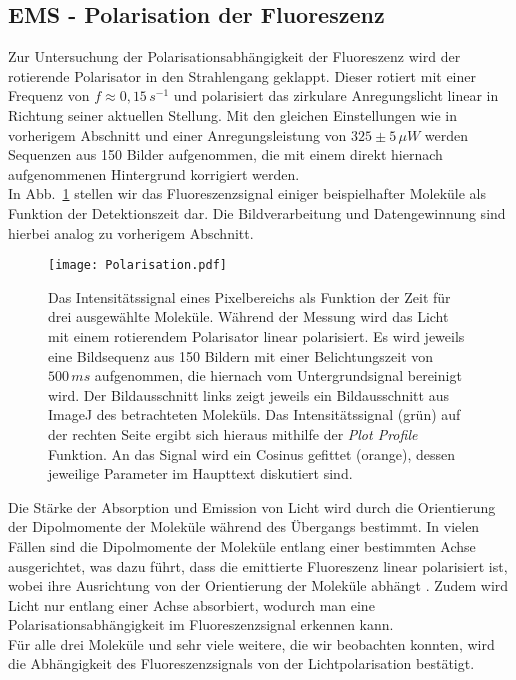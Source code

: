 \subsection{\label{subsec:A3}EMS - Polarisation der Fluoreszenz}
Zur Untersuchung der Polarisationsabhängigkeit der Fluoreszenz wird der rotierende Polarisator in den 
Strahlengang geklappt. Dieser rotiert mit einer Frequenz von $f\approx 0,15\,\si{s^{-1}}$ und 
polarisiert das zirkulare Anregungslicht linear in Richtung seiner aktuellen Stellung. 
Mit den gleichen Einstellungen wie in vorherigem Abschnitt und einer Anregungsleistung von $325\pm5\,\si{\mu W}$ werden 
Sequenzen aus 150 Bilder aufgenommen, 
die mit einem direkt hiernach aufgenommenen Hintergrund korrigiert werden. \\
In Abb.~\ref{fig:polari} stellen wir das Fluoreszenzsignal einiger beispielhafter Moleküle als Funktion der 
Detektionszeit dar. Die Bildverarbeitung und Datengewinnung sind hierbei analog zu vorherigem Abschnitt.
\begin{figure}[h!]
    \centering
    \texttt{[image: Polarisation.pdf]}
    \caption{\label{fig:polari}Das Intensitätssignal eines Pixelbereichs als Funktion
    der Zeit für drei ausgewählte Moleküle. 
    Während der Messung wird das Licht mit einem rotierendem
    Polarisator linear polarisiert. Es wird jeweils eine Bildsequenz aus 150 Bildern mit einer Belichtungszeit von 
    $500\,\si{ms}$ aufgenommen, die hiernach vom Untergrundsignal bereinigt wird. Der Bildausschnitt links zeigt jeweils 
    ein Bildausschnitt aus ImageJ des betrachteten Moleküls. Das Intensitätssignal (grün) auf der rechten Seite ergibt sich 
    hieraus mithilfe der \textit{Plot Profile} Funktion. An das Signal wird ein Cosinus gefittet (orange), dessen 
    jeweilige Parameter im Haupttext diskutiert sind.}
\end{figure}\FloatBarrier
Die Stärke der Absorption und Emission von Licht wird durch die Orientierung der Dipolmomente der Moleküle während des 
Übergangs bestimmt. In vielen Fällen sind die Dipolmomente der Moleküle entlang einer bestimmten Achse ausgerichtet, 
was dazu führt, dass die emittierte Fluoreszenz linear polarisiert ist, wobei ihre Ausrichtung 
von der Orientierung der Moleküle abhängt \cite{Prinzip}. Zudem wird Licht nur entlang einer Achse absorbiert, 
wodurch man eine Polarisationsabhängigkeit im Fluoreszenzsignal erkennen kann. \\
Für alle drei Moleküle und sehr viele weitere, die wir beobachten konnten, wird die 
Abhängigkeit des Fluoreszenzsignals von der Lichtpolarisation bestätigt. 
